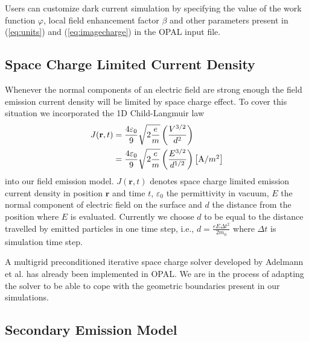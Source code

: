 \documentclass{JAC2003}
\begin{document}
Users can customize dark current simulation by specifying the value of the work
function $\varphi$, local field enhancement factor $\beta$ and other parameters
present in (\ref{eq:units}) and (\ref{eq:imagecharge}) in the OPAL input file.

\subsection{Space Charge Limited Current Density}

Whenever the normal components of an electric field are strong enough the field
emission current density will be limited by space charge effect\cite{BC}. 
To cover this situation we incorporated the 1D Child-Langmuir law
%
\begin{align}\label{eq:SpaceCharge}
    J(\mathbf{r},t) & =\frac{4\varepsilon_0}{9}\sqrt{2\frac{e}{m}}\left(\frac{V^{3/2}}{d^2}\right)\notag\\
    &
    =\frac{4\varepsilon_0}{9}\sqrt{2\frac{e}{m}}\left(\frac{E^{3/2}}{d^{1/2}}\right)
    \left[\hbox{A/$m^2$}\right]
\end{align}
%
into our field emission model. $J(\mathbf{r},t)$ denotes space charge limited emission 
current density in position $\mathbf{r}$ and time $t$, $\varepsilon_0$ the
permittivity in vacuum, $E$ the normal component of electric field on the surface
and $d$ the distance from the position where $E$ is evaluated. Currently we 
choose $d$ to be equal to the distance travelled by emitted particles in one
time step, i.e., $d=\frac{eE\Delta{t}^2}{2m_0}$ where $\Delta{t}$ is simulation
time step.

A multigrid preconditioned iterative space charge solver developed by Adelmann
et al. \cite{SV} has already been implemented in OPAL. We are in the process of
adapting the solver to be able to cope with the geometric boundaries present in 
our simulations.

\subsection{Secondary Emission Model}
\end{document}
